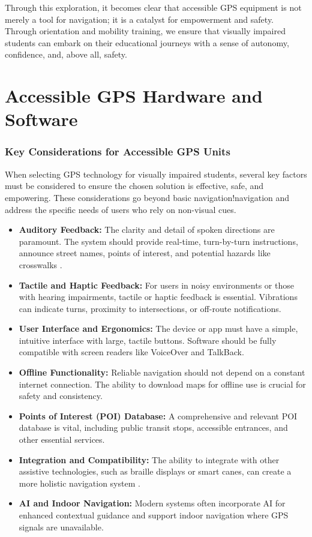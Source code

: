 Through this exploration, it becomes clear that accessible GPS equipment is not merely a tool for \gls{navigation}; it is a catalyst for empowerment and safety. Through \gls{orientation} and \gls{mobility} training, we ensure that visually impaired students can embark on their educational journeys with a sense of autonomy, confidence, and, above all, safety.

\section{Accessible GPS Hardware and Software}\label{ch8:sec:accessible-gps-hardware}

\subsubsection{Key Considerations for Accessible GPS Units}
When selecting GPS \gls{technology} for visually impaired students, several key factors must be considered to ensure the chosen solution is effective, safe, and empowering. These considerations go beyond basic navigation!navigation and address the specific needs of users who rely on non-visual cues.

\begin{itemize}
	\item \textbf{Auditory Feedback:} The clarity and detail of spoken directions are paramount. The system should provide real-time, turn-by-turn instructions, announce street names, points of interest, and potential hazards like crosswalks \supercite{InclusiveCityMaker2023}.
	\item \textbf{Tactile and Haptic Feedback:} For users in noisy environments or those with hearing impairments, tactile or haptic feedback is essential. Vibrations can indicate turns, proximity to intersections, or off-route notifications.
	\item \textbf{User Interface and Ergonomics:} The device or app must have a simple, intuitive interface with large, tactile buttons. Software should be fully compatible with screen readers like VoiceOver and TalkBack.
	\item \textbf{Offline Functionality:} Reliable navigation should not depend on a constant internet connection. The ability to download maps for offline use is crucial for safety and consistency.
	\item \textbf{Points of Interest (POI) Database:} A comprehensive and relevant POI database is vital, including public transit stops, accessible entrances, and other essential services.
	\item \textbf{Integration and Compatibility:} The ability to integrate with other assistive technologies, such as braille displays or smart canes, can create a more holistic navigation system \supercite{AFBGPS2023}.
	\item \textbf{AI and Indoor Navigation:} Modern systems often incorporate AI for enhanced contextual guidance and support indoor navigation where GPS signals are unavailable.
\end{itemize}

